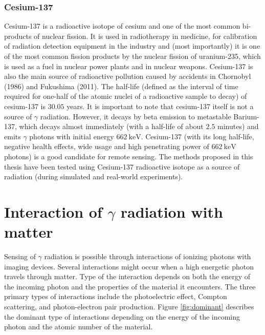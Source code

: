 \subsubsection{Cesium-137}
Cesium-137 is a radioactive isotope of cesium and one of the most common bi-products of nuclear fission.
It is used in radiotherapy in medicine, for calibration of radiation detection equipment in the industry and 
(most importantly) it is one of the most common fission products by the nuclear fission of uranium-235, which is used as a fuel in nuclear power plants and in nuclear weapons.
Cesium-137 is also the main source of radioactive pollution caused by accidents in Chornobyl (1986) and Fukushima (2011).
The half-life (defined as the interval of time required for one-half of the atomic nuclei of a radioactive sample to decay) of cesium-137 is $30.05$ years.
It is important to note that cesium-137 itself is not a source of $\gamma$ radiation.
However, it decays by beta emission to metastable Barium-137, which decays almost immediately (with a half-life of about $2.5$ minutes) and emits $\gamma$ photons with initial energy $\SI{662}{\kilo\electronvolt}$.
Cesium-137 (with its long half-life, negative health effects, wide usage and high penetrating power of $\SI{662}{\kilo\electronvolt}$ photons) is a good candidate for remote sensing. 
The methods proposed in this thesis have been tested using Cesium-137 radioactive isotope as a source of radiation (during simulated and real-world experiments).

\section{Interaction of $\gamma$ radiation with matter}
Sensing of $\gamma$ radiation is possible through interactions of ionizing photons with imaging devices.
Several interactions might occur when a high energetic photon travels through matter.
Type of the interaction depends on both the energy of the incoming photon and the properties of the material it encounters. 
The three primary types of interactions include the photoelectric effect, Compton scattering, and photon-electron pair production.
Figure \ref{fig:dominant} describes the dominant type of interactions depending on the energy of the incoming photon and the atomic number of the material.

